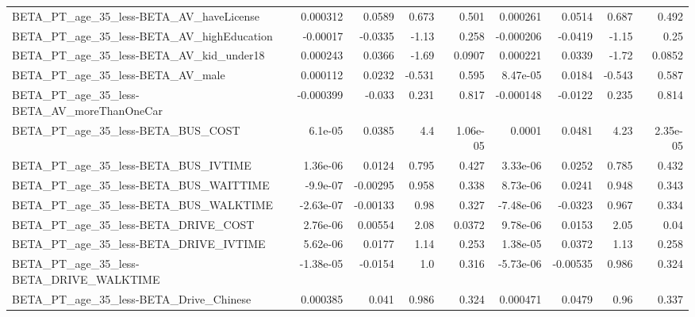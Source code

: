 \begin{tabular}{lrrrrrrrr}
BETA\_PT\_age\_35\_less-BETA\_AV\_haveLicense            &    0.000312 &       0.0589 &    0.673 &    0.501 &   0.000261 &      0.0514 &        0.687 &         0.492 \\
BETA\_PT\_age\_35\_less-BETA\_AV\_highEducation          &    -0.00017 &      -0.0335 &    -1.13 &    0.258 &  -0.000206 &     -0.0419 &        -1.15 &          0.25 \\
BETA\_PT\_age\_35\_less-BETA\_AV\_kid\_under18            &    0.000243 &       0.0366 &    -1.69 &   0.0907 &   0.000221 &      0.0339 &        -1.72 &        0.0852 \\
BETA\_PT\_age\_35\_less-BETA\_AV\_male                   &    0.000112 &       0.0232 &   -0.531 &    0.595 &   8.47e-05 &      0.0184 &       -0.543 &         0.587 \\
BETA\_PT\_age\_35\_less-BETA\_AV\_moreThanOneCar         &   -0.000399 &       -0.033 &    0.231 &    0.817 &  -0.000148 &     -0.0122 &        0.235 &         0.814 \\
BETA\_PT\_age\_35\_less-BETA\_BUS\_COST                  &     6.1e-05 &       0.0385 &      4.4 & 1.06e-05 &     0.0001 &      0.0481 &         4.23 &      2.35e-05 \\
BETA\_PT\_age\_35\_less-BETA\_BUS\_IVTIME                &    1.36e-06 &       0.0124 &    0.795 &    0.427 &   3.33e-06 &      0.0252 &        0.785 &         0.432 \\
BETA\_PT\_age\_35\_less-BETA\_BUS\_WAITTIME              &    -9.9e-07 &     -0.00295 &    0.958 &    0.338 &   8.73e-06 &      0.0241 &        0.948 &         0.343 \\
BETA\_PT\_age\_35\_less-BETA\_BUS\_WALKTIME              &   -2.63e-07 &     -0.00133 &     0.98 &    0.327 &  -7.48e-06 &     -0.0323 &        0.967 &         0.334 \\
BETA\_PT\_age\_35\_less-BETA\_DRIVE\_COST                &    2.76e-06 &      0.00554 &     2.08 &   0.0372 &   9.78e-06 &      0.0153 &         2.05 &          0.04 \\
BETA\_PT\_age\_35\_less-BETA\_DRIVE\_IVTIME              &    5.62e-06 &       0.0177 &     1.14 &    0.253 &   1.38e-05 &      0.0372 &         1.13 &         0.258 \\
BETA\_PT\_age\_35\_less-BETA\_DRIVE\_WALKTIME            &   -1.38e-05 &      -0.0154 &      1.0 &    0.316 &  -5.73e-06 &    -0.00535 &        0.986 &         0.324 \\
BETA\_PT\_age\_35\_less-BETA\_Drive\_Chinese             &    0.000385 &        0.041 &    0.986 &    0.324 &   0.000471 &      0.0479 &         0.96 &         0.337 \\

\end{tabular}
